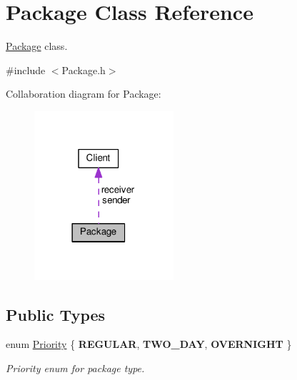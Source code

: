 \hypertarget{classPackage}{}\section{Package Class Reference}
\label{classPackage}


\hyperlink{classPackage}{Package} class.  




{\ttfamily \#include $<$Package.\+h$>$}



Collaboration diagram for Package\+:\nopagebreak
\begin{figure}[H]
\begin{center}
\leavevmode
\includegraphics[width=146pt]{classPackage__coll__graph}
\end{center}
\end{figure}
\subsection*{Public Types}
\begin{DoxyCompactItemize}
\item 
enum \hyperlink{classPackage_ac96ebcf78f2d93898635a1275da0c0bd}{Priority} \{ {\bfseries R\+E\+G\+U\+L\+AR}, 
{\bfseries T\+W\+O\+\_\+\+D\+AY}, 
{\bfseries O\+V\+E\+R\+N\+I\+G\+HT}
 \}\hypertarget{classPackage_ac96ebcf78f2d93898635a1275da0c0bd}{}\label{classPackage_ac96ebcf78f2d93898635a1275da0c0bd}
\begin{DoxyCompactList}\small\item\em Priority enum for package type. \end{DoxyCompactList}
\end{DoxyCompactItemize}
